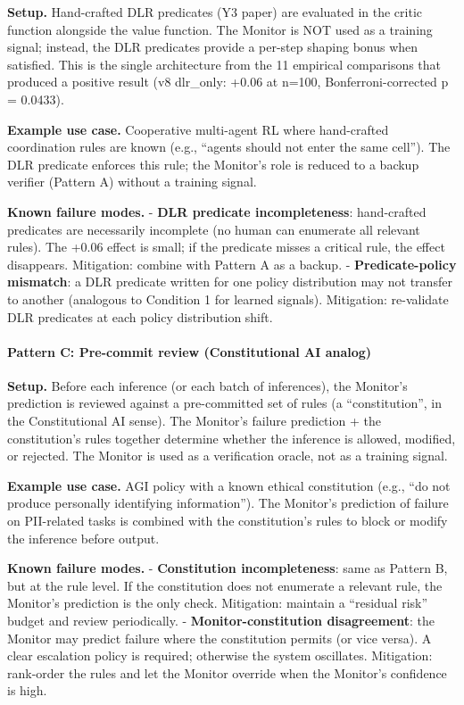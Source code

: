 \documentclass[
]{article}
\begin{document}
\textbf{Setup.} Hand-crafted DLR predicates (Y3 paper) are evaluated in
the critic function alongside the value function. The Monitor is NOT
used as a training signal; instead, the DLR predicates provide a
per-step shaping bonus when satisfied. This is the single architecture
from the 11 empirical comparisons that produced a positive result (v8
dlr\_only: +0.06 at n=100, Bonferroni-corrected p = 0.0433).

\textbf{Example use case.} Cooperative multi-agent RL where hand-crafted
coordination rules are known (e.g., ``agents should not enter the same
cell''). The DLR predicate enforces this rule; the Monitor's role is
reduced to a backup verifier (Pattern A) without a training signal.

\textbf{Known failure modes.} - \textbf{DLR predicate incompleteness}:
hand-crafted predicates are necessarily incomplete (no human can
enumerate all relevant rules). The +0.06 effect is small; if the
predicate misses a critical rule, the effect disappears. Mitigation:
combine with Pattern A as a backup. - \textbf{Predicate-policy
mismatch}: a DLR predicate written for one policy distribution may not
transfer to another (analogous to Condition 1 for learned signals).
Mitigation: re-validate DLR predicates at each policy distribution
shift.

\paragraph{Pattern C: Pre-commit review (Constitutional AI
analog)}\label{pattern-c-pre-commit-review-constitutional-ai-analog}

\textbf{Setup.} Before each inference (or each batch of inferences), the
Monitor's prediction is reviewed against a pre-committed set of rules (a
``constitution'', in the Constitutional AI sense). The Monitor's failure
prediction + the constitution's rules together determine whether the
inference is allowed, modified, or rejected. The Monitor is used as a
verification oracle, not as a training signal.

\textbf{Example use case.} AGI policy with a known ethical constitution
(e.g., ``do not produce personally identifying information''). The
Monitor's prediction of failure on PII-related tasks is combined with
the constitution's rules to block or modify the inference before output.

\textbf{Known failure modes.} - \textbf{Constitution incompleteness}:
same as Pattern B, but at the rule level. If the constitution does not
enumerate a relevant rule, the Monitor's prediction is the only check.
Mitigation: maintain a ``residual risk'' budget and review periodically.
- \textbf{Monitor-constitution disagreement}: the Monitor may predict
failure where the constitution permits (or vice versa). A clear
escalation policy is required; otherwise the system oscillates.
Mitigation: rank-order the rules and let the Monitor override when the
Monitor's confidence is high.
\end{document}
